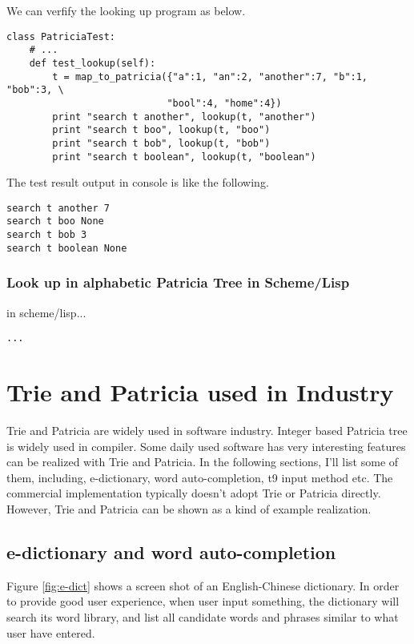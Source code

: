 \documentclass{article}
\begin{document}
We can verfify the looking up program as below.

\begin{lstlisting}
class PatriciaTest:
    # ...
    def test_lookup(self):
        t = map_to_patricia({"a":1, "an":2, "another":7, "b":1, "bob":3, \
                            "bool":4, "home":4})
        print "search t another", lookup(t, "another")
        print "search t boo", lookup(t, "boo")
        print "search t bob", lookup(t, "bob")
        print "search t boolean", lookup(t, "boolean")
\end{lstlisting}

The test result output in console is like the following.

\begin{verbatim}
search t another 7
search t boo None
search t bob 3
search t boolean None
\end{verbatim}

\subsubsection*{Look up in alphabetic Patricia Tree in Scheme/Lisp}
in scheme/lisp...

\lstset{language=lisp}
\begin{lstlisting}
...
\end{lstlisting}

\section{Trie and Patricia used in Industry}
Trie and Patricia are widely used in software industry. Integer based
Patricia tree is widely used in compiler. Some daily
used software has very interesting features can be realized with 
Trie and Patricia. In the following sections, I'll list some of them,
including, e-dictionary, word auto-completion, t9 input method etc.
The commercial implementation typically doesn't adopt Trie or Patricia
directly. However, Trie and Patricia can be shown as a kind of 
example realization.

\subsection{e-dictionary and word auto-completion}
Figure \ref{fig:e-dict} shows a screen shot of an English-Chinese dictionary.
In order to provide good user experience, when user input something, 
the dictionary will search its word library, and list all candidate words and
phrases similar to what user have entered.
\end{document}
